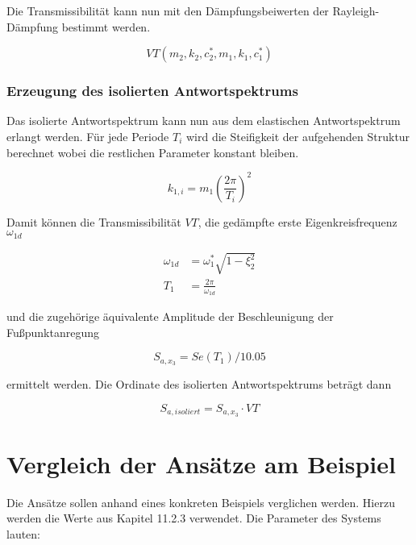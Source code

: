 Die Transmissibilität kann nun mit den Dämpfungsbeiwerten der Rayleigh-Dämpfung bestimmt werden.

\begin{equation}
VT(m_2, k_2, c_2^*, m_1, k_1, c_1^*)
\end{equation}

\subsubsection{Erzeugung des isolierten Antwortspektrums}
\label{sec:transmAWS}

Das isolierte Antwortspektrum kann nun aus dem elastischen Antwortspektrum erlangt werden.
Für jede Periode $T_i$ wird die Steifigkeit der aufgehenden Struktur berechnet wobei die restlichen Parameter konstant bleiben.

\begin{equation}
k_{1,i} = m_1 (\frac{2 \pi}{T_i})^2
\end{equation}
  
Damit können die Transmissibilität $VT$, die gedämpfte erste Eigenkreisfrequenz $\omega_{1d}$

\begin{align}
\omega_{1d} &= \omega_1^* \sqrt{1 - \xi_2^2} \\
T_1 &= \frac{2 \pi}{\omega_{1d}}
\end{align}

und die zugehörige äquivalente Amplitude der Beschleunigung der Fußpunktanregung

\begin{equation}
S_{a,x_3} = Se(T_1) / 10.05
\end{equation}

ermittelt werden. Die Ordinate des isolierten Antwortspektrums beträgt dann

\begin{equation}
S_{a,isoliert} = S_{a,x_3} \cdot VT
\end{equation}
  
\pagebreak

\section{Vergleich der Ansätze am Beispiel}
\label{sec:vergleich}

Die Ansätze sollen anhand eines konkreten Beispiels verglichen werden. Hierzu werden die Werte aus \cite{Isemann} Kapitel 11.2.3 verwendet.
Die Parameter des Systems lauten:

